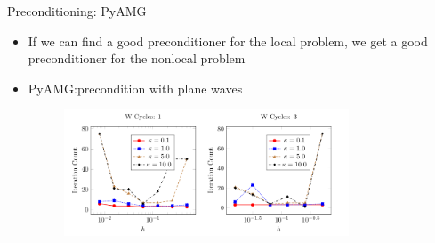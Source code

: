 \documentclass{beamer}
\begin{document}
\begin{frame}{Preconditioning: PyAMG}
    \begin{itemize}
        \item If we can find a good preconditioner for the local
            problem, we get a good preconditioner for the nonlocal
            problem
        \vfill
        \item<2->PyAMG:\@ precondition with plane waves
            \begin{figure}[ht]
            \begin{center}
                \includegraphics[width=0.8\textwidth]{images/pyamg.png}
            \end{center}
            \end{figure}
    \end{itemize}
\end{frame}
\end{document}
